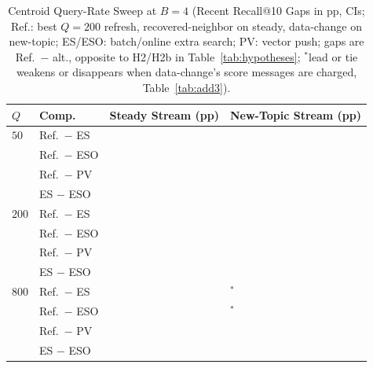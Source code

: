 \begin{table}[!t]
\centering
\caption{Centroid Query-Rate Sweep at $B = 4$ (Recent Recall@10 Gaps in pp, \RNumCIPct{} CIs; Ref.: best $Q{=}200$ refresh, recovered-neighbor on steady, data-change on new-topic; ES/ESO: batch/online extra search; PV: vector push; gaps are Ref.\ $-$ alt., opposite to H2/H2b in Table~\ref{tab:hypotheses}; $^{\ast}$lead or tie weakens or disappears when data-change's score messages are charged, Table~\ref{tab:add3}).}
\label{tab:q_sweep}
\scriptsize
\renewcommand{\arraystretch}{0.68}
\setlength{\tabcolsep}{3.0pt}
\begin{tabular}{@{}llll@{}}
\toprule
\textbf{$Q$} & \textbf{Comp.} & \textbf{Steady Stream (pp)} & \textbf{New-Topic Stream (pp)} \\
\midrule
$50$ & Ref.\ $-$ ES & \RNumQSweepRefMinusESQFiftySteadyCell{} & \RNumQSweepRefMinusESQFiftyNewTopicCell{} \\
 & Ref.\ $-$ ESO & \RNumQSweepRefMinusESOQFiftySteadyCell{} & \RNumQSweepRefMinusESOQFiftyNewTopicCell{} \\
 & Ref.\ $-$ PV & \RNumQSweepRefMinusPVQFiftySteadyCell{} & \RNumQSweepRefMinusPVQFiftyNewTopicCell{} \\
 & ES $-$ ESO & \RNumLookaheadMOneQFiftySteadyCell{} & \RNumLookaheadMOneQFiftyNewTopicCell{} \\
$200$ & Ref.\ $-$ ES & \RNumQSweepRefMinusESQTwoHundredSteadyCell{} & \RNumQSweepRefMinusESQTwoHundredNewTopicCell{} \\
 & Ref.\ $-$ ESO & \RNumQSweepRefMinusESOQTwoHundredSteadyCell{} & \RNumQSweepRefMinusESOQTwoHundredNewTopicCell{} \\
 & Ref.\ $-$ PV & \RNumQSweepRefMinusPVQTwoHundredSteadyCell{} & \RNumQSweepRefMinusPVQTwoHundredNewTopicCell{} \\
 & ES $-$ ESO & \RNumLookaheadMOneQTwoHundredSteadyCell{} & \RNumLookaheadMOneQTwoHundredNewTopicCell{} \\
$800$ & Ref.\ $-$ ES & \RNumQSweepRefMinusESQEightHundredSteadyCell{} & \RNumQSweepRefMinusESQEightHundredNewTopicCell{}$^{\ast}$ \\
 & Ref.\ $-$ ESO & \RNumQSweepRefMinusESOQEightHundredSteadyCell{} & \RNumQSweepRefMinusESOQEightHundredNewTopicCell{}$^{\ast}$ \\
 & Ref.\ $-$ PV & \RNumQSweepRefMinusPVQEightHundredSteadyCell{} & \RNumQSweepRefMinusPVQEightHundredNewTopicCell{} \\
 & ES $-$ ESO & \RNumLookaheadMOneQEightHundredSteadyCell{} & \RNumLookaheadMOneQEightHundredNewTopicCell{} \\
\bottomrule
\end{tabular}
\end{table}

